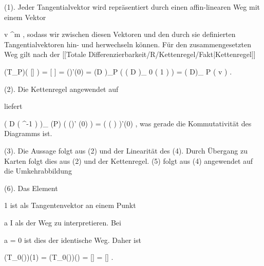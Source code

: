 {

\teilbeweis {}{}{}
{(1). Jeder Tangentialvektor wird repräsentiert durch einen affin-linearen Weg
 mit einem Vektor

\mavergleichskette
{\vergleichskette
{v
}
{ \in }{\R^m
}
{  }{
}
{    }{
}
{   }{
}
}
{}{}{,}
sodass wir zwischen diesen Vektoren und den durch sie definierten Tangentialvektoren hin- und herwechseln können. Für den zusammengesetzten Weg
\mathl{\varphi \circ \gamma}{} gilt nach der
[[Totale Differenzierbarkeit/R/Kettenregel/Fakt|Kettenregel]]

\mavergleichskettedisp
{\vergleichskette
{ (T_P\varphi )( [\gamma ] )
}
{ =} { [ \varphi \circ \gamma ]
}
{ =} { (\varphi \circ \gamma)'(0)
}
{ =} { (D \varphi)_P \left( \left(  D \gamma  \right)_{ 0 } \left(   1  \right) \right)
}
{ =} { \left(  D\varphi  \right)_{ P } \left(  v  \right)
}
}
{}{}{.}}
{}
\teilbeweis {}{}{}
{(2). Die Kettenregel angewendet auf
 {} {}

 {  }

liefert

\mavergleichskettedisp
{\vergleichskette
{ \left(  D   \left(   \beta \circ \varphi \circ \alpha^{-1}    \right)      \right)_{ \alpha(P)} \left(   (\alpha \circ \gamma)' (0)    \right)
}
{ =} { ( \beta \circ ( \varphi \circ \gamma) )'(0)
}
{ } {
}
{ } {
}
{ } {
}
}
{}{}{,}
was gerade die Kommutativität des Diagramms ist.}
{}
\teilbeweis {}{}{}
{(3). Die Aussage folgt aus (2) und der Linearität des
}
{}
\teilbeweis {}{}{}
{(4). Durch Übergang zu Karten folgt dies aus (2) und der Kettenregel.}
{}
\teilbeweis {}{}{}
{(5) folgt aus (4) angewendet auf die Umkehrabbildung
}
{}
\teilbeweis {}{}{}
{(6). Das Element

\mavergleichskette
{\vergleichskette
{ 1
}
{ \in }{\R
}
{  }{
}
{    }{
}
{   }{
}
}
{}{}{}
ist als Tangentenvektor an einem Punkt

\mavergleichskette
{\vergleichskette
{a
}
{ \in }{ I
}
{  }{
}
{    }{
}
{   }{
}
}
{}{}{}
als der Weg
 zu interpretieren. Bei

\mavergleichskette
{\vergleichskette
{a
}
{ = }{ 0
}
{  }{
}
{    }{
}
{   }{
}
}
{}{}{}
ist dies der identische Weg. Daher ist

\mavergleichskettedisp
{\vergleichskette
{ (T_0(\gamma))(1)
}
{ =} { (T_0(\gamma))()
}
{ =} { [\gamma \circ {}]
}
{ =} { [\gamma ]
}
{ } {
}
}
{}{}{.}}
{}

}

